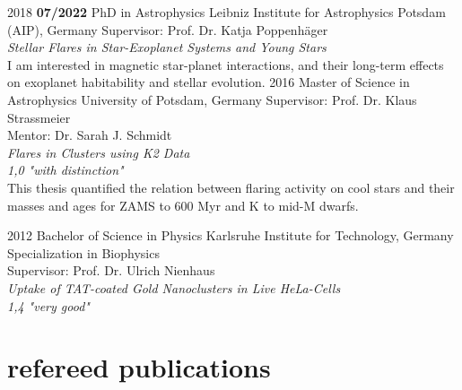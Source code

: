 \documentclass[]{k-cv} %
\begin{document}
\begin{entrylist}
\entry
{2018 \to \textbf{07/2022}}
{PhD {\normalfont in Astrophysics}}
{Leibniz Institute for Astrophysics Potsdam (AIP), Germany}
{Supervisor: Prof. Dr. Katja Poppenh\"ager\\
\emph{Stellar Flares in Star-Exoplanet Systems and Young Stars} \vspace{0.2cm}\\ I am interested in magnetic star-planet interactions, and their long-term effects on exoplanet habitability and stellar evolution.}
\entry
{2016 }
{Master {\normalfont of Science in Astrophysics}}
{University of Potsdam, Germany}
{Supervisor: Prof. Dr. Klaus Strassmeier \\
 Mentor: Dr. Sarah J. Schmidt\\
\emph{Flares in Clusters using K2 Data} \\ 
\emph{1,0 "with distinction"}\vspace{0.2cm}\\
This thesis quantified the relation between flaring activity on cool stars and their masses and ages for ZAMS to 600 Myr and K to mid-M dwarfs.}


\entry
{2012 }
{Bachelor {\normalfont of Science in Physics}}
{Karlsruhe Institute for Technology, Germany}
{Specialization in Biophysics\\
Supervisor: Prof. Dr. Ulrich Nienhaus\\
\emph{Uptake of TAT-coated Gold Nanoclusters in Live HeLa-Cells}\\
\emph{1,4 "very good"}}
\end{entrylist}



\section{refereed publications}
\end{document}
